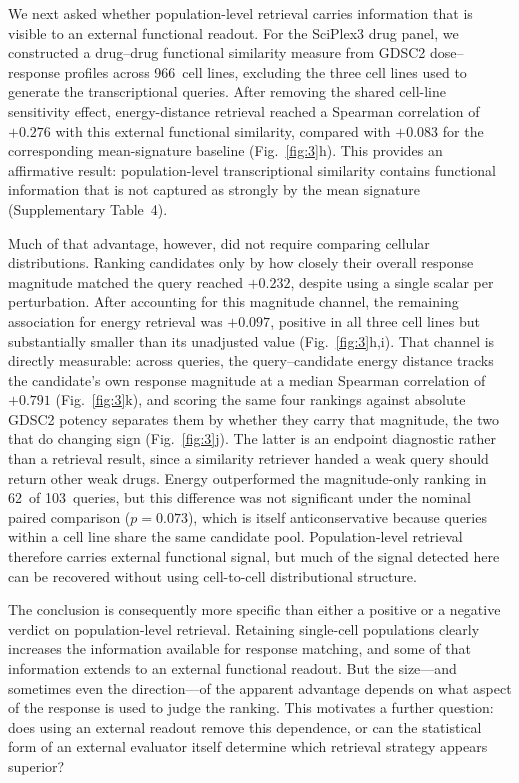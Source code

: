 \documentclass[11pt,letterpaper]{article}
\newcommand{\CTXLINES}{966}
\newcommand{\NCQUERIES}{103}
\newcommand{\ENERGYFUNC}{+0.276}
\newcommand{\MEANCTRLFUNC}{+0.083}
\newcommand{\MAGMATCHFUNC}{+0.232}
\newcommand{\ENERGYPARTIAL}{+0.097}
\newcommand{\ENERGYWINS}{62}
\newcommand{\ENERGYWINSP}{0.073}
\begin{document}
We next asked whether population-level retrieval carries information that is visible to an external functional readout. For the SciPlex3 drug panel, we constructed a drug--drug functional similarity measure from GDSC2\cite{GDSC,GDSCLandscape} dose--response profiles across \CTXLINES\ cell lines, excluding the three cell lines used to generate the transcriptional queries. After removing the shared cell-line sensitivity effect, energy-distance retrieval reached a Spearman correlation of $\ENERGYFUNC$ with this external functional similarity, compared with $\MEANCTRLFUNC$ for the corresponding mean-signature baseline (Fig.~\ref{fig:3}h). This provides an affirmative result: population-level transcriptional similarity contains functional information that is not captured as strongly by the mean signature (Supplementary Table~4).

Much of that advantage, however, did not require comparing cellular distributions. Ranking candidates only by how closely their overall response magnitude matched the query reached $\MAGMATCHFUNC$, despite using a single scalar per perturbation. After accounting for this magnitude channel, the remaining association for energy retrieval was $\ENERGYPARTIAL$, positive in all three cell lines but substantially smaller than its unadjusted value (Fig.~\ref{fig:3}h,i). That channel is directly measurable: across queries, the query--candidate energy distance tracks the candidate's own response magnitude at a median Spearman correlation of $+0.791$ (Fig.~\ref{fig:3}k), and scoring the same four rankings against absolute GDSC2 potency separates them by whether they carry that magnitude, the two that do changing sign (Fig.~\ref{fig:3}j). The latter is an endpoint diagnostic rather than a retrieval result, since a similarity retriever handed a weak query should return other weak drugs. Energy outperformed the magnitude-only ranking in \ENERGYWINS\ of \NCQUERIES\ queries, but this difference was not significant under the nominal paired comparison ($p=\ENERGYWINSP$), which is itself anticonservative because queries within a cell line share the same candidate pool. Population-level retrieval therefore carries external functional signal, but much of the signal detected here can be recovered without using cell-to-cell distributional structure.

The conclusion is consequently more specific than either a positive or a negative verdict on population-level retrieval. Retaining single-cell populations clearly increases the information available for response matching, and some of that information extends to an external functional readout. But the size---and sometimes even the direction---of the apparent advantage depends on what aspect of the response is used to judge the ranking. This motivates a further question: does using an external readout remove this dependence, or can the statistical form of an external evaluator itself determine which retrieval strategy appears superior?
\end{document}
